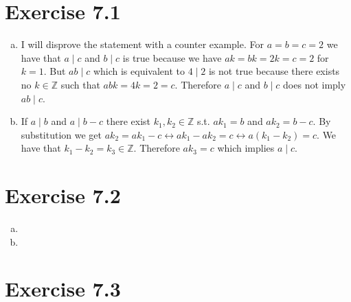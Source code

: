 \documentclass{article} %
\newcommand{\homeworkNumber}{7}
\begin{document}
\section*{Exercise \homeworkNumber.1}

\begin{enumerate}[(a)]
	\item I will disprove the statement with a counter example. For \( a = b = c = 2 \) we have that \( a \mid c \) and \( b \mid c \) is true because we have \( ak = bk = 2k = c = 2 \) for \( k = 1 \). But \( ab \mid c \) which is equivalent to \( 4 \mid 2 \) is not true because there exists no \( k \in \mathbb{Z} \) such that \( abk = 4k = 2 = c\). Therefore \( a \mid c \) and \( b \mid c \) does not imply \( ab \mid c \).
	\item If \( a \mid b \) and \( a \mid b-c \) there exist \( k_{1}, k_{2} \in  \mathbb{Z} \) s.t. \( ak_{1} = b \) and \( ak_{2}=b-c \). By substitution we get \( ak_{2} = ak_{1}-c \leftrightarrow ak_{1} - ak_{2} = c \leftrightarrow a(k_{1}-k_{2}) = c \). We have that \( k_{1}-k_{2} = k_{3} \in \mathbb{Z} \). Therefore \( ak_{3} = c \) which implies \( a \mid c \).
\end{enumerate}



\section*{Exercise \homeworkNumber.2}

\begin{enumerate}[(a)]
	\item
	\item
\end{enumerate}



\section*{Exercise \homeworkNumber.3}

\end{document}
